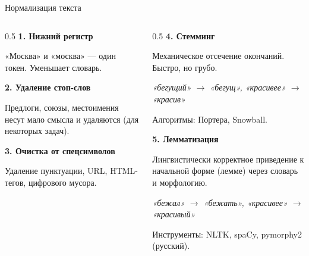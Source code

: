 \documentclass[aspectratio=169, 9pt]{beamer}
\begin{document}
\begin{frame}{Нормализация текста}
  \begin{columns}[T]
    \begin{column}{0.5\textwidth}
      \textbf{1. Нижний регистр}
      
      «Москва» и «москва» — один токен. Уменьшает словарь.
      
      \vspace{0.5em}
      \textbf{2. Удаление стоп-слов}
      
      Предлоги, союзы, местоимения несут мало смысла и удаляются (для некоторых задач).
      
      \vspace{0.5em}
      \textbf{3. Очистка от спецсимволов}
      
      Удаление пунктуации, URL, HTML-тегов, цифрового мусора.
    \end{column}
    \begin{column}{0.5\textwidth}
      \textbf{4. Стемминг}
      
      Механическое отсечение окончаний. Быстро, но грубо.
      
      \textit{«бегущий» $\to$ «бегущ», «красивее» $\to$ «красив»}
      
      Алгоритмы: Портера, Snowball.
      
      \vspace{0.5em}
      \textbf{5. Лемматизация}
      
      Лингвистически корректное приведение к начальной форме (лемме) через словарь и морфологию.
      
      \textit{«бежал» $\to$ «бежать», «красивее» $\to$ «красивый»}
      
      Инструменты: NLTK, spaCy, pymorphy2 (русский).
    \end{column}
  \end{columns}
\end{frame}
\end{document}

